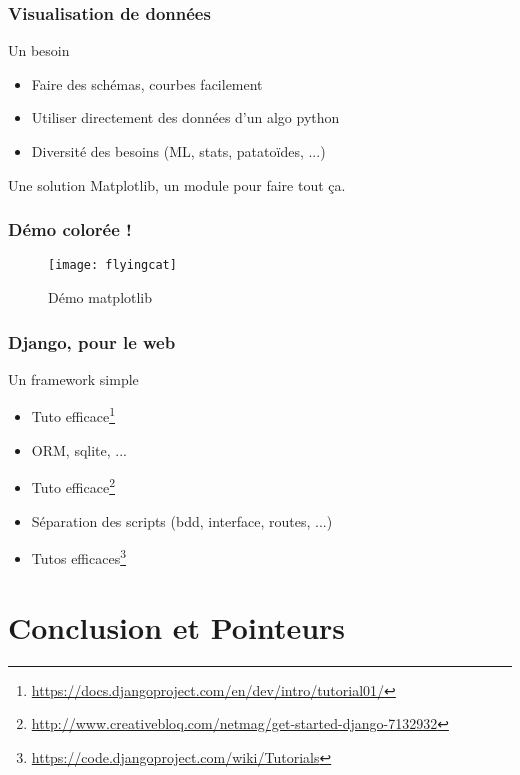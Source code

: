 \documentclass{beamer}
\begin{document}
\begin{frame}
  \frametitle{Visualisation de données}

  \begin{block}{Un besoin}
    \begin{itemize}
    \item Faire des schémas, courbes facilement
    \item Utiliser directement des données d'un algo python
    \item Diversité des besoins (ML, stats, patatoïdes, ...)
    \end{itemize}
  \end{block}

  \begin{block}{Une solution}
    Matplotlib, un module pour faire tout ça.
  \end{block}
\end{frame}

\begin{frame}
  \frametitle{Démo colorée !}

  \begin{figure}[!h*]
    \centering
    \texttt{[image: flyingcat]}
    \caption{Démo matplotlib}
    \label{fig:matplotlibdemo}
  \end{figure}
\end{frame}

\begin{frame}
  \frametitle{Django, pour le web}

  \begin{block}{Un framework simple}
    \begin{itemize}
    \item Tuto
      efficace\footnote{\url{https://docs.djangoproject.com/en/dev/intro/tutorial01/}}
    \item ORM, sqlite, ...
    \item Tuto efficace\footnote{\url{http://www.creativebloq.com/netmag/get-started-django-7132932}}
    \item Séparation des scripts (bdd, interface, routes, ...)
    \item Tutos efficaces\footnote{\url{https://code.djangoproject.com/wiki/Tutorials}}
    \end{itemize}
  \end{block}
\end{frame}


\section{Conclusion et Pointeurs}
\label{sec:conclusion}
\end{document}
